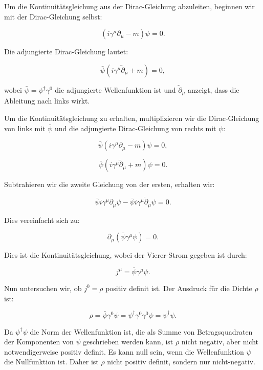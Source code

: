Um die Kontinuitätsgleichung aus der Dirac-Gleichung abzuleiten, beginnen wir mit der Dirac-Gleichung selbst:

\[
(i \gamma^\mu \partial_\mu - m) \psi = 0.
\]

Die adjungierte Dirac-Gleichung lautet:

\[
\bar{\psi} (i \gamma^\mu \overleftarrow{\partial}_\mu + m) = 0,
\]

wobei \(\bar{\psi} = \psi^\dagger \gamma^0\) die adjungierte Wellenfunktion ist und \(\overleftarrow{\partial}_\mu\) anzeigt, dass die Ableitung nach links wirkt.

Um die Kontinuitätsgleichung zu erhalten, multiplizieren wir die Dirac-Gleichung von links mit \(\bar{\psi}\) und die adjungierte Dirac-Gleichung von rechts mit \(\psi\):

\[
\bar{\psi} (i \gamma^\mu \partial_\mu - m) \psi = 0,
\]

\[
\bar{\psi} (i \gamma^\mu \overleftarrow{\partial}_\mu + m) \psi = 0.
\]

Subtrahieren wir die zweite Gleichung von der ersten, erhalten wir:

\[
\bar{\psi} i \gamma^\mu \partial_\mu \psi - \bar{\psi} i \gamma^\mu \overleftarrow{\partial}_\mu \psi = 0.
\]

Dies vereinfacht sich zu:

\[
\partial_\mu (\bar{\psi} \gamma^\mu \psi) = 0.
\]

Dies ist die Kontinuitätsgleichung, wobei der Vierer-Strom gegeben ist durch:

\[
j^\mu = \bar{\psi} \gamma^\mu \psi.
\]

Nun untersuchen wir, ob \(j^0 = \rho\) positiv definit ist. Der Ausdruck für die Dichte \(\rho\) ist:

\[
\rho = \bar{\psi} \gamma^0 \psi = \psi^\dagger \gamma^0 \gamma^0 \psi = \psi^\dagger \psi.
\]

Da \(\psi^\dagger \psi\) die Norm der Wellenfunktion ist, die als Summe von Betragsquadraten der Komponenten von \(\psi\) geschrieben werden kann, ist \(\rho\) nicht negativ, aber nicht notwendigerweise positiv definit. Es kann null sein, wenn die Wellenfunktion \(\psi\) die Nullfunktion ist. Daher ist \(\rho\) nicht positiv definit, sondern nur nicht-negativ.